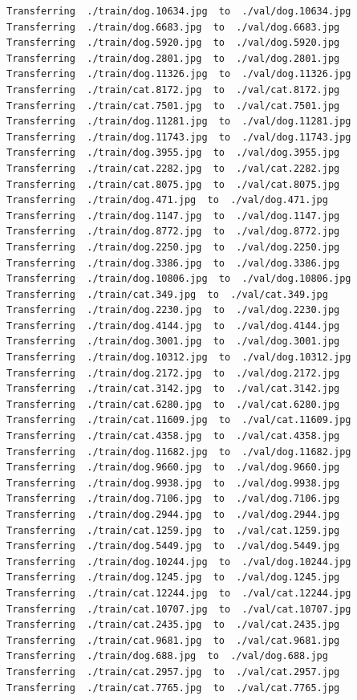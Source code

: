 \documentclass[]{book}
\theoremstyle{definition}
\theoremstyle{definition}
\theoremstyle{definition}
\theoremstyle{remark}
\begin{document}
\begin{verbatim}
Transferring  ./train/dog.10634.jpg  to  ./val/dog.10634.jpg
Transferring  ./train/dog.6683.jpg  to  ./val/dog.6683.jpg
Transferring  ./train/dog.5920.jpg  to  ./val/dog.5920.jpg
Transferring  ./train/dog.2801.jpg  to  ./val/dog.2801.jpg
Transferring  ./train/dog.11326.jpg  to  ./val/dog.11326.jpg
Transferring  ./train/cat.8172.jpg  to  ./val/cat.8172.jpg
Transferring  ./train/cat.7501.jpg  to  ./val/cat.7501.jpg
Transferring  ./train/dog.11281.jpg  to  ./val/dog.11281.jpg
Transferring  ./train/dog.11743.jpg  to  ./val/dog.11743.jpg
Transferring  ./train/dog.3955.jpg  to  ./val/dog.3955.jpg
Transferring  ./train/cat.2282.jpg  to  ./val/cat.2282.jpg
Transferring  ./train/cat.8075.jpg  to  ./val/cat.8075.jpg
Transferring  ./train/dog.471.jpg  to  ./val/dog.471.jpg
Transferring  ./train/dog.1147.jpg  to  ./val/dog.1147.jpg
Transferring  ./train/dog.8772.jpg  to  ./val/dog.8772.jpg
Transferring  ./train/dog.2250.jpg  to  ./val/dog.2250.jpg
Transferring  ./train/dog.3386.jpg  to  ./val/dog.3386.jpg
Transferring  ./train/dog.10806.jpg  to  ./val/dog.10806.jpg
Transferring  ./train/cat.349.jpg  to  ./val/cat.349.jpg
Transferring  ./train/dog.2230.jpg  to  ./val/dog.2230.jpg
Transferring  ./train/dog.4144.jpg  to  ./val/dog.4144.jpg
Transferring  ./train/dog.3001.jpg  to  ./val/dog.3001.jpg
Transferring  ./train/dog.10312.jpg  to  ./val/dog.10312.jpg
Transferring  ./train/dog.2172.jpg  to  ./val/dog.2172.jpg
Transferring  ./train/cat.3142.jpg  to  ./val/cat.3142.jpg
Transferring  ./train/cat.6280.jpg  to  ./val/cat.6280.jpg
Transferring  ./train/cat.11609.jpg  to  ./val/cat.11609.jpg
Transferring  ./train/cat.4358.jpg  to  ./val/cat.4358.jpg
Transferring  ./train/dog.11682.jpg  to  ./val/dog.11682.jpg
Transferring  ./train/dog.9660.jpg  to  ./val/dog.9660.jpg
Transferring  ./train/dog.9938.jpg  to  ./val/dog.9938.jpg
Transferring  ./train/dog.7106.jpg  to  ./val/dog.7106.jpg
Transferring  ./train/dog.2944.jpg  to  ./val/dog.2944.jpg
Transferring  ./train/cat.1259.jpg  to  ./val/cat.1259.jpg
Transferring  ./train/dog.5449.jpg  to  ./val/dog.5449.jpg
Transferring  ./train/dog.10244.jpg  to  ./val/dog.10244.jpg
Transferring  ./train/dog.1245.jpg  to  ./val/dog.1245.jpg
Transferring  ./train/cat.12244.jpg  to  ./val/cat.12244.jpg
Transferring  ./train/cat.10707.jpg  to  ./val/cat.10707.jpg
Transferring  ./train/cat.2435.jpg  to  ./val/cat.2435.jpg
Transferring  ./train/cat.9681.jpg  to  ./val/cat.9681.jpg
Transferring  ./train/dog.688.jpg  to  ./val/dog.688.jpg
Transferring  ./train/cat.2957.jpg  to  ./val/cat.2957.jpg
Transferring  ./train/cat.7765.jpg  to  ./val/cat.7765.jpg

\end{verbatim}
\end{document}
